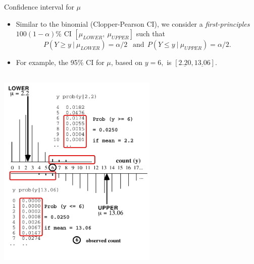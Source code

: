 \documentclass[handout]{beamer}\usepackage[]{graphicx}\usepackage[]{color}
\begin{document}
\begin{frame}[fragile]{Confidence interval for $\mu$}
\begin{itemize}
\setlength\itemsep{2em}

\item Similar to the binomial (Clopper-Pearson CI), we consider a \textit{first-principles} $100(1-\alpha)\%$ CI $[\mu_{LOWER},\: \mu_{UPPER}]$ such that  
$$P(Y \ge y \: | \: \mu_{LOWER}) = \alpha/2 \:\: \textrm{ and} \:\:  P(Y \le y \: | \: \mu_{UPPER}) = \alpha/2.$$
\item For example, the  95\% CI for $\mu$, based on $y=6,$ is  $[\underline{2.20}, \underline{13.06}].$ 
\end{itemize}
\end{frame}




\begin{frame}
\centering
\includegraphics[width=3in,height=4in]{CI_Poisson(6).pdf}
\end{frame}
\end{document}
